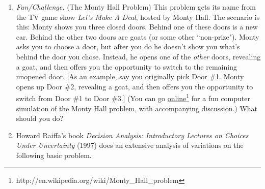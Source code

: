 \begin{enumerate}
{So casinos or insurance companies are not necessarily any riskier as business endeavors than, say, running a photocopy shop.}







\item \emph{Fun/Challenge.} (The Monty Hall Problem) This problem gets its name from the TV game show \emph{Let's Make A Deal}, hosted by Monty Hall. The scenario is this: Monty shows you three closed doors. Behind one of these doors is a new car. Behind the other two doors are goats (or some other ``non-prize"). Monty asks you to choose a door, but after you do he doesn't show you what's behind the door you chose. Instead, he opens one of the \emph{other} doors, revealing a goat, and then offers you the opportunity to switch to the remaining unopened door. [As an example, say you originally pick Door \#1. Monty opens up Door \#2, revealing a goat, and then offers you the opportunity to switch from Door \#1 to Door \#3.] (You can go \href{http://en.wikipedia.org/wiki/Monty_Hall_problem}{online}\footnote{http://en.wikipedia.org/wiki/Monty\_Hall\_problem} for a fun computer simulation of the Monty Hall problem, with accompanying discussion.) What should you do?



\item Howard Raiffa's book \emph{Decision Analysis: Introductory Lectures on Choices Under Uncertainty} (1997) does an extensive analysis of variations on the following basic problem.


\end{enumerate}
